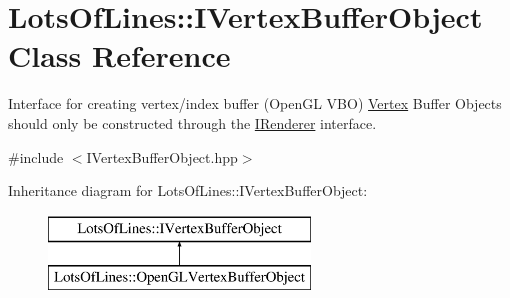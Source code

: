 \hypertarget{class_lots_of_lines_1_1_i_vertex_buffer_object}{}\section{Lots\+Of\+Lines\+:\+:I\+Vertex\+Buffer\+Object Class Reference}
\label{class_lots_of_lines_1_1_i_vertex_buffer_object}


Interface for creating vertex/index buffer (Open\+GL V\+BO) \hyperlink{struct_lots_of_lines_1_1_vertex}{Vertex} Buffer Objects should only be constructed through the \hyperlink{class_lots_of_lines_1_1_i_renderer}{I\+Renderer} interface.  




{\ttfamily \#include $<$I\+Vertex\+Buffer\+Object.\+hpp$>$}

Inheritance diagram for Lots\+Of\+Lines\+:\+:I\+Vertex\+Buffer\+Object\+:\begin{figure}[H]
\begin{center}
\leavevmode
\includegraphics[height=2.000000cm]{class_lots_of_lines_1_1_i_vertex_buffer_object}
\end{center}
\end{figure}
